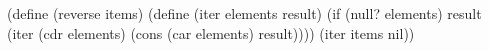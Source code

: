 \begtt\scm
(define (reverse items)
  (define (iter elements result)
    (if (null? elements)
        result
        (iter (cdr elements)
              (cons (car elements) result))))
  (iter items nil))
\endtt
